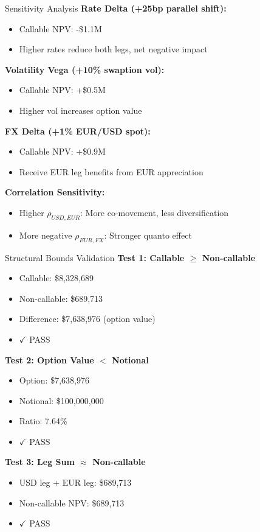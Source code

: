 \documentclass[aspectratio=169,11pt]{beamer}
\begin{document}
\begin{frame}{Sensitivity Analysis}
\textbf{Rate Delta (+25bp parallel shift):}
\begin{itemize}
    \item Callable NPV: -\$1.1M
    \item Higher rates reduce both legs, net negative impact
\end{itemize}

\textbf{Volatility Vega (+10\% swaption vol):}
\begin{itemize}
    \item Callable NPV: +\$0.5M
    \item Higher vol increases option value
\end{itemize}

\textbf{FX Delta (+1\% EUR/USD spot):}
\begin{itemize}
    \item Callable NPV: +\$0.9M
    \item Receive EUR leg benefits from EUR appreciation
\end{itemize}

\textbf{Correlation Sensitivity:}
\begin{itemize}
    \item Higher $\rho_{USD,EUR}$: More co-movement, less diversification
    \item More negative $\rho_{EUR,FX}$: Stronger quanto effect
\end{itemize}
\end{frame}

\begin{frame}{Structural Bounds Validation}
\textbf{Test 1: Callable $\geq$ Non-callable}
\begin{itemize}
    \item Callable: \$8,328,689
    \item Non-callable: \$689,713
    \item Difference: \$7,638,976 (option value)
    \item \textcolor{green!60!black}{$\checkmark$ PASS}
\end{itemize}

\textbf{Test 2: Option Value $<$ Notional}
\begin{itemize}
    \item Option: \$7,638,976
    \item Notional: \$100,000,000
    \item Ratio: 7.64\%
    \item \textcolor{green!60!black}{$\checkmark$ PASS}
\end{itemize}

\textbf{Test 3: Leg Sum $\approx$ Non-callable}
\begin{itemize}
    \item USD leg + EUR leg: \$689,713
    \item Non-callable NPV: \$689,713
    \item \textcolor{green!60!black}{$\checkmark$ PASS}
\end{itemize}
\end{frame}
\end{document}
